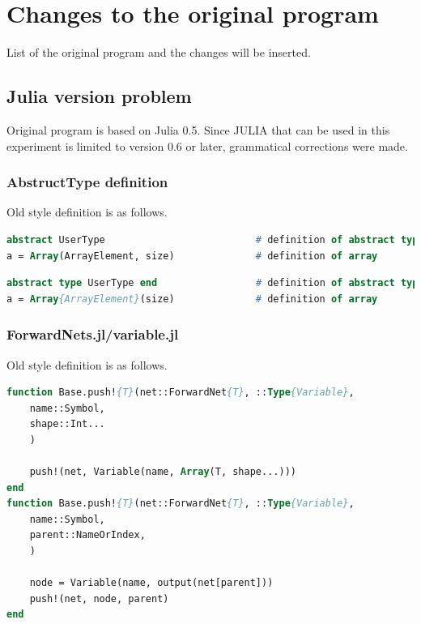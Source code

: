 \section{Changes to the original program}


List of the original program and the changes will be inserted.


\subsection{Julia version problem}

Original program is based on Julia 0.5. 
Since JULIA that can be used in this experiment is limited to version 0.6 or later, grammatical corrections were made.

\subsubsection{AbstructType definition}

Old style definition is as follows.

\begin{lstlisting}[caption=Julia old style definition ,label=list:julia_05_def, escapechar=!, language=Pascal, frame=single]
abstract UserType                          # definition of abstract type
a = Array(ArrayElement, size)              # definition of array
\end{lstlisting}



\begin{lstlisting}[caption=Julia 0.6 style ,label=list:julia_06_def, escapechar=!, language=Pascal, frame=single]
abstract type UserType end                 # definition of abstract type
a = Array{ArrayElement}(size)              # definition of array
\end{lstlisting}


\subsubsection{ForwardNets.jl/variable.jl}

Old style definition is as follows.

\begin{lstlisting}[caption=Original code 
,label=list:julia_05_forwardnets, language=Pascal, frame=single]
function Base.push!{T}(net::ForwardNet{T}, ::Type{Variable},
    name::Symbol,
    shape::Int...
    )

    push!(net, Variable(name, Array(T, shape...)))
end
function Base.push!{T}(net::ForwardNet{T}, ::Type{Variable},
    name::Symbol,
    parent::NameOrIndex,
    )

    node = Variable(name, output(net[parent]))
    push!(net, node, parent)
end
\end{lstlisting}

